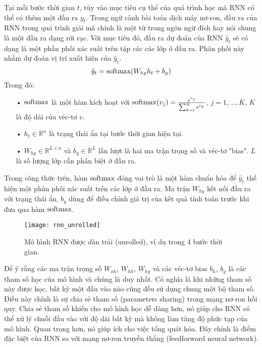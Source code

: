 Tại mỗi bước thời gian $t$, tùy vào mục tiêu cụ thể của quá trình học mà RNN có thể có thêm một đầu ra $y_t$. Trong ngữ cảnh bài toán dịch máy nơ-ron, đầu ra của RNN trong quá trình giải mã chính là một từ trong ngôn ngữ đích hay nói chung là một đầu ra dạng rời rạc. Với mục tiêu đó, đầu ra dự đoán của RNN $\hat{y}_t$ sẽ có dạng là một phần phối xác suất trên tập các các lớp ở đầu ra. Phân phối này nhằm dự đoán vị trí xuất hiện của $\hat{y}_t$.
\begin{equation} \label{rnnOuputSoftmaxDistribution}
	\hat{y}_t = \mathrm{softmax}(W_{hy}h_t + b_y)
\end{equation}
Trong đó:
\begin{itemize}
	\item[•] $\mathrm{softmax}$ là một hàm kích hoạt với $\mathrm{softmax}(v_j) = \frac{e^{v_j}}{\sum_{k=1}^{K}e^{v_k}}$, $j = 1,...,K$, $K$ là độ dài của véc-tơ $v$.
	\item[•] $h_{t} \in \mathbb{R}^n$ là trạng thái ẩn tại bước thời gian hiện tại.
	\item[•] $W_{hy} \in \mathbb{R}^{L \times n}$ và $b_y \in \mathbb{R}^L$ lần lượt là hai ma trận trọng số và véc-tơ "bias". $L$ là số lượng lớp cần phân biệt ở đầu ra.
\end{itemize}

Trong công thức trên, hàm $\mathrm{softmax}$ đóng vai trò là một hàm chuẩn hóa để $\hat{y}_t$ thể hiện một phân phối xác suất trên các lớp ở đầu ra. Ma trận $W_{hy}$ kết nối đầu ra với trạng thái ẩn, $b_y$ dùng để điều chỉnh giá trị của kết quả tính toán trước khi đưa qua hàm $\mathrm{softmax}$.

\begin{figure}
	\centering
	\texttt{[image: rnn\_unrolled]}
	\caption[Mô hình RNN dạng dàn trải]{Mô hình RNN được dàn trải (unrolled), ví dụ trong 4 bước thời gian.}
	\label{fig_rnn_unrolled}
\end{figure}

Để ý rằng các ma trận trọng số $W_{xh}$, $W_{hh}$, $W_{hy}$ và các véc-tơ bias $b_h$, $b_y$ là các tham số học của mô hình và chúng là duy nhất. Có nghĩa là khi những tham số này được học, bất kỳ một đầu vào nào cũng đều sử dụng chung một bộ tham số. Điều này chính là sự chia sẻ tham số (parameters sharing) trong mạng nơ-ron hồi quy. Chia sẻ tham số khiến cho mô hình học dễ dàng hơn, nó giúp cho RNN có thể xử lý chuỗi đầu vào với độ dài bất kỳ mà không làm tăng độ phức tạp của mô hình. Quan trọng hơn, nó giúp ích cho việc tổng quát hóa. Đây chính là điểm đặc biệt của RNN so với mạng nơ-ron truyền thẳng (feedforward neural network).


